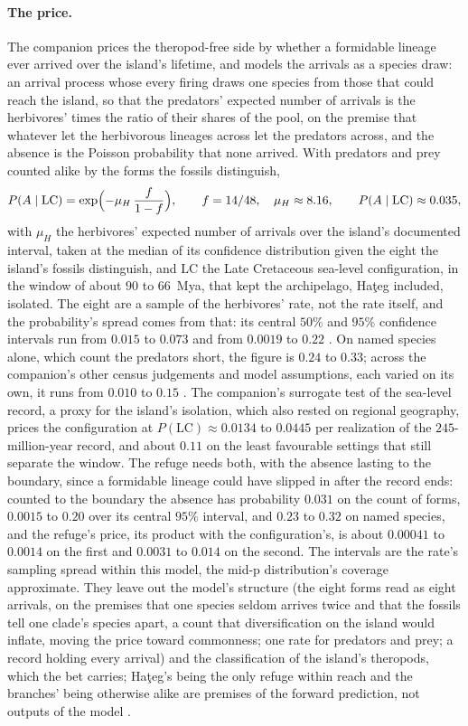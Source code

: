 \documentclass[11pt]{article}
\theoremstyle{definition}
\begin{document}
\paragraph{The price.} The companion prices the theropod-free side by whether a formidable lineage ever arrived over the island's lifetime, and models the arrivals as a species draw: an arrival process whose every firing draws one species from those that could reach the island, so that the predators' expected number of arrivals is the herbivores' times the ratio of their shares of the pool, on the premise that whatever let the herbivorous lineages across let the predators across, and the absence is the Poisson probability that none arrived. With predators and prey counted alike by the forms the fossils distinguish,
\[
P(A \mid \mathrm{LC}) = \exp\Bigl(-\mu_H \, \frac{f}{1-f}\Bigr), \qquad f = 14/48, \quad \mu_H \approx 8.16, \qquad P(A \mid \mathrm{LC}) \approx 0.035,
\]
with $\mu_H$ the herbivores' expected number of arrivals over the island's documented interval, taken at the median of its confidence distribution given the eight the island's fossils distinguish, and $\mathrm{LC}$ the Late Cretaceous sea-level configuration, in the window of about $90$ to $66$~Mya, that kept the archipelago, Ha\c{t}eg included, isolated. The eight are a sample of the herbivores' rate, not the rate itself, and the probability's spread comes from that: its central $50\%$ and $95\%$ confidence intervals run from $0.015$ to $0.073$ and from $0.0019$ to $0.22$ \cite{Nexus}. On named species alone, which count the predators short, the figure is $0.24$ to $0.33$; across the companion's other census judgements and model assumptions, each varied on its own, it runs from $0.010$ to $0.15$ \cite{Nexus}. The companion's surrogate test of the sea-level record, a proxy for the island's isolation, which also rested on regional geography, prices the configuration at $P(\mathrm{LC}) \approx 0.0134$ to $0.0445$ per realization of the $245$-million-year record, and about $0.11$ on the least favourable settings that still separate the window. The refuge needs both, with the absence lasting to the boundary, since a formidable lineage could have slipped in after the record ends: counted to the boundary the absence has probability $0.031$ on the count of forms, $0.0015$ to $0.20$ over its central $95\%$ interval, and $0.23$ to $0.32$ on named species, and the refuge's price, its product with the configuration's, is about $0.00041$ to $0.0014$ on the first and $0.0031$ to $0.014$ on the second. The intervals are the rate's sampling spread within this model, the mid-p distribution's coverage approximate. They leave out the model's structure (the eight forms read as eight arrivals, on the premises that one species seldom arrives twice and that the fossils tell one clade's species apart, a count that diversification on the island would inflate, moving the price toward commonness; one rate for predators and prey; a record holding every arrival) and the classification of the island's theropods, which the bet carries; Ha\c{t}eg's being the only refuge within reach and the branches' being otherwise alike are premises of the forward prediction, not outputs of the model \cite{Nexus}.
\end{document}
